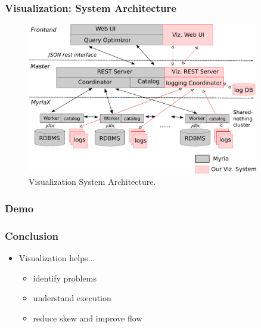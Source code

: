 \documentclass[mathserif,serif,handout]{beamer}
\begin{document}
\begin{frame}
  \frametitle{Visualization: System Architecture}
  \begin{figure}
  	 \begin{center}
       \includegraphics[width=0.9\textwidth]{viz_arch.pdf}
     \end{center}
     \caption{Visualization System Architecture.}
    \label{fig:viz_arc}
  \end{figure}
\end{frame}

\begin{frame}
  \frametitle{Demo}
\end{frame}

\begin{frame}
  \frametitle{Conclusion}
  \begin{itemize}
    \item Visualization helps...
    \begin{itemize}
      \item identify problems
      \item understand execution
      \item reduce skew and improve flow
    \end{itemize}
  \end{itemize}
\end{frame}
\end{document}
